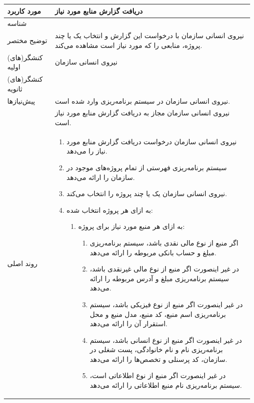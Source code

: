 \newpage
\begin{table}[H]
	\centering
	\begin{tabular}{|p{3cm}|p{10cm}|}
		\hline
	
		مورد کاربرد & دریافت گزارش منابع مورد نیاز  \\
		\hline
		
		شناسه & 
		\stepcounter{usecase_ID}
		
		\arabic{usecase_ID} \\
		
		\hline
		
		توضیح مختصر & نیروی انسانی سازمان با درخواست این گزارش و انتخاب یک یا چند پروژه، منابعی را که مورد نیاز است مشاهده می‌کند. \\
		\hline
		
		کنشگر(های) اولیه& نیروی انسانی سازمان \\
		\hline
		
		کنشگر(های) ثانویه&  \\
		\hline
		
		پیش‌نیازها
		& نیروی انسانی سازمان در سیستم برنامه‌ریزی وارد شده است.\\
		& نیروی انسانی سازمان مجاز به دریافت گزارش منابع مورد نیاز است. \\
		\hline
		
		
		روند اصلی &
		\begin{enumerate}[topsep=0cm,leftmargin=0.5cm]
			\item نیروی انسانی سازمان درخواست دریافت گزارش منابع مورد نیاز را می‌دهد.
			\item سیستم برنامه‌ریزی فهرستی از تمام پروژه‌های موجود در سازمان را ارائه می‌دهد. 
			\item نیروی انسانی سازمان یک یا چند پروژه را انتخاب می‌کند.
			\item به ازای هر پروژه انتخاب شده:
			\begin{enumerate}[topsep=0cm,leftmargin=0.5cm]
				\item به ازای هر منبع مورد نیاز برای پروژه:
				\begin{enumerate}[topsep=0cm,leftmargin=0.5cm]
					\item اگر منبع از نوع مالی نقدی باشد، سیستم برنامه‌ریزی مبلغ و حساب بانکی مربوطه را ارائه می‌دهد.
					\item در غیر اینصورت اگر منبع از نوع مالی غیرنقدی باشد، سیستم برنامه‌ریزی مبلغ و آدرس مربوطه را ارائه می‌دهد.
					\item در غیر اینصورت اگر منبع از نوع فیزیکی باشد، سیستم برنامه‌ریزی اسم منبع، کد منبع، مدل منبع و محل استقرار آن را ارائه می‌دهد.
					\item در غیر اینصورت اگر منبع از نوع انسانی باشد، سیستم برنامه‌ریزی نام و نام خانوادگی، پست شغلی در سازمان، کد پرسنلی و تخصص‌ها را ارائه می‌دهد.
					\item در غیر اینصورت اگر منبع از نوع اطلاعاتی است، سیستم برنامه‌ریزی نام منبع اطلاعاتی را ارائه می‌دهد.
				\end{enumerate}
			\end{enumerate}
		\end{enumerate} \\
		\hline
		

\end{tabular}
\end{table}

